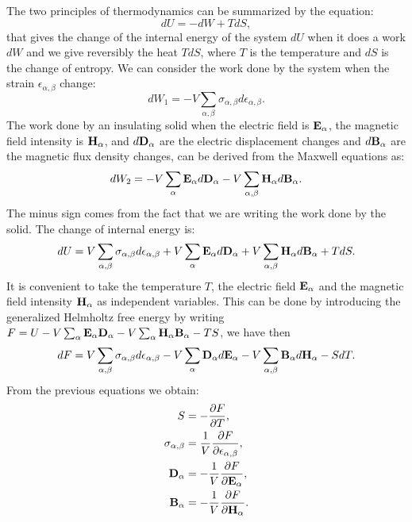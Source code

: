 \documentclass[12pt,a4paper,twoside]{report}
\begin{document}
The two principles of thermodynamics can be summarized by the equation:
\begin{equation}
dU = -dW + T dS,
\end{equation}
that gives the change of the internal energy of the system $dU$ when
it does a work $dW$ and we give reversibly the heat $T dS$, where $T$ 
is the temperature and $dS$ is the change of entropy.
We can consider the work done by the system when the strain
$\epsilon_{\alpha,\beta}$ change:
\begin{equation}
dW_1 =-V \sum_{\alpha,\beta} \sigma_{\alpha,\beta} d \epsilon_{\alpha,\beta}. 
\end{equation}
The work done by an insulating solid when the electric field is 
${\bf E}_\alpha$, the magnetic field intensity is ${\bf H}_\alpha$, 
and $d {\bf D}_\alpha$ are the electric displacement changes and 
$d {\bf B}_\alpha$ are the magnetic flux density changes, can be derived
from the Maxwell equations as: 
\begin{equation}
dW_2 = -V \sum_\alpha {\bf E}_\alpha d {\bf D}_\alpha 
-V \sum_{\alpha,\beta} {\bf H}_{\alpha} d {\bf B}_\alpha.
\end{equation}
The minus sign comes from the fact that we are writing the work done by the
solid. The change of internal energy is:
\begin{equation}
dU = V \sum_{\alpha,\beta} \sigma_{\alpha,\beta} d \epsilon_{\alpha,\beta}
+ V \sum_\alpha {\bf E}_\alpha d {\bf D}_\alpha + 
V \sum_{\alpha,\beta} {\bf H}_{\alpha} d {\bf B}_\alpha + T dS.
\end{equation}
It is convenient to take the temperature $T$,
the electric field ${\bf E}_\alpha$ and the magnetic field intensity
${\bf H}_\alpha$ as independent variables.
This can be done by introducing the generalized Helmholtz free energy 
by writing
$F=U- V \sum_{\alpha} {\bf E}_\alpha {\bf D}_\alpha -
V \sum_{\alpha} {\bf H}_\alpha {\bf B}_\alpha - TS $, we have then
\begin{equation}
dF = V \sum_{\alpha,\beta} \sigma_{\alpha,\beta} d \epsilon_{\alpha,\beta}
- V \sum_\alpha {\bf D}_\alpha d {\bf E}_\alpha - 
V \sum_{\alpha,\beta} {\bf B}_{\alpha} d {\bf H}_\alpha - S dT.
\end{equation}
From the previous equations we obtain:
\begin{align}
S&=-{\partial F \over \partial T}, \\
\sigma_{\alpha,\beta}&= {1\over V}
{\partial F \over \partial \epsilon_{\alpha,\beta}}, \\
{\bf D}_{\alpha}&= -{1\over V}
{\partial F \over \partial {\bf E}_{\alpha}}, \\
{\bf B}_{\alpha}&= -{1\over V}
{\partial F \over \partial {\bf H}_{\alpha}}.
\end{align}
\end{document}
